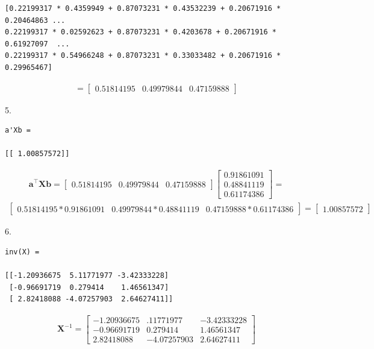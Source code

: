 \documentclass[10pt]{article}
\begin{document}
\begin{enumerate}
\begin{verbatim}
[0.22199317 * 0.4359949 + 0.87073231 * 0.43532239 + 0.20671916 * 0.20464863 ...
0.22199317 * 0.02592623 + 0.87073231 * 0.4203678 + 0.20671916 * 0.61927097  ...
0.22199317 * 0.54966248 + 0.87073231 * 0.33033482 + 0.20671916 * 0.29965467]  
\end{verbatim}
\begin{eqnarray*}
=
    \begin{bmatrix}
    0.51814195 & 0.49979844 & 0.47159888
    \end{bmatrix}
\end{eqnarray*}

5. 

\begin{verbatim}
a'Xb =

[[ 1.00857572]] 

\end{verbatim}

\begin{eqnarray*}
\mathbf{a}^\top\mathbf{X}\mathbf{b} =
	\begin{bmatrix}
	0.51814195 & 0.49979844 & 0.47159888
	\end{bmatrix}
    \begin{bmatrix}
	0.91861091 \\[0.3em]
    0.48841119 \\[0.3em]
    0.61174386
    \end{bmatrix} = 
\end{eqnarray*}
\begin{eqnarray*}
    \begin{bmatrix}
	0.51814195 * 0.91861091 & 0.49979844 * 0.48841119 & 0.47159888 * 0.61174386
	\end{bmatrix} =
    \begin{bmatrix}
    1.00857572
    \end{bmatrix}
\end{eqnarray*}

6. 

\begin{verbatim}
inv(X) =

[[-1.20936675  5.11771977 -3.42333228]
 [-0.96691719  0.279414    1.46561347]
 [ 2.82418088 -4.07257903  2.64627411]] 
\end{verbatim}

\begin{eqnarray*}
\mathbf{X}^{-1} =
	\begin{bmatrix}
	-1.20936675 & .11771977 & -3.42333228 \\[0.3em]
    -0.96691719 & 0.279414 & 1.46561347 \\[0.3em]
    2.82418088 & -4.07257903 & 2.64627411
	\end{bmatrix}
\end{eqnarray*}



\end{enumerate}
\end{document}
